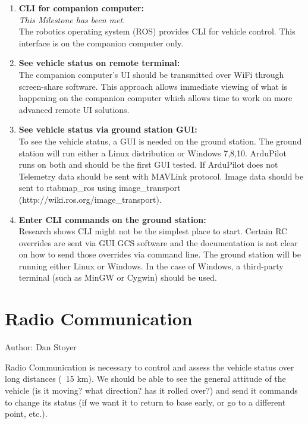 \documentclass[compsoc,draftclsnofoot,onecolumn,10pt]{IEEEtran}
\begin{document}
\begin{enumerate}
	
	\item \textbf{CLI for companion computer:}\\
	\textit{This Milestone has been met.}\\
	The robotics operating system (ROS) provides CLI for vehicle control. This
	interface is on the companion computer only.
	
	\item \textbf{See vehicle status on remote terminal:}\\
	The companion computer's UI should be transmitted over WiFi through screen-share
	software. This approach allows immediate viewing of what is happening on the
	companion computer which allows time to work on more advanced remote UI solutions.
	
	\item \textbf{See vehicle status via ground station GUI:}\\
	To see the vehicle status, a GUI is needed on the ground station. The ground
	station will run either a Linux distribution or Windows 7,8,10. ArduPilot runs
	on both and should be the first GUI tested. If ArduPilot does not
	Telemetry data should be sent with MAVLink protocol. Image data should be sent
	to rtabmap\_ros using image\_transport (http://wiki.ros.org/image\_transport).
	
	\item \textbf{Enter CLI commands on the ground station:}\\
	Research shows CLI might not be the simplest place to start. Certain
	RC overrides are sent via GUI GCS software and the documentation is not clear
	on how to send those overrides via command line.
	The ground station will be running either Linux or Windows. In the case of
	Windows, a third-party terminal (such as MinGW or Cygwin) should be used.

\end{enumerate}

\section{Radio Communication}
Author: Dan Stoyer\par

Radio Communication is necessary to control and assess the vehicle status over long distances (~15 km).
We should be able to see the general attitude of the vehicle (is it moving? what direction? has it rolled over?)
and send it commands to change its status (if we want it to return to base early, or go to a different point, etc.).
\end{document}
